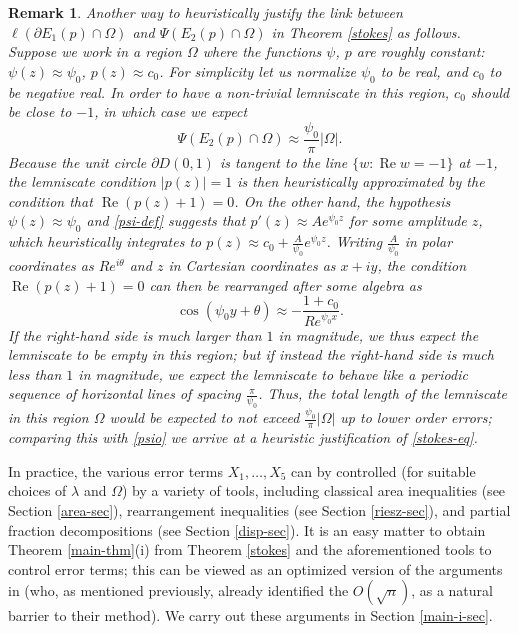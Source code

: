 \documentclass[12pt]{amsart}
\newtheorem{remark}{Remark}[section]
\renewcommand{\Re}{\operatorname{Re}}
\begin{document}
\begin{remark} Another way to heuristically justify the link between $\ell(\partial E_1(p) \cap \Omega)$ and $\Psi(E_2(p) \cap \Omega)$ in Theorem \ref{stokes} as follows.  Suppose we work in a region $\Omega$ where the functions $\psi$, $p$ are roughly constant: $\psi(z) \approx \psi_0$, $p(z) \approx c_0$.  For simplicity let us normalize $\psi_0$ to be real, and $c_0$ to be negative real.  In order to have a non-trivial lemniscate in this region, $c_0$ should be close to $-1$, in which case we expect
    \begin{equation}\label{psio}
        \Psi(E_2(p) \cap \Omega) \approx \frac{\psi_0}{\pi} |\Omega|.
    \end{equation}
  Because the unit circle $\partial D(0,1)$ is tangent to the line $\{ w: \Re w = -1\}$ at $-1$, the lemniscate condition $|p(z)|=1$ is then heuristically approximated by the condition that $\Re (p(z) + 1) = 0$.  On the other hand, the hypothesis $\psi(z) \approx \psi_0$ and \eqref{psi-def} suggests that $p'(z) \approx A e^{\psi_0 z}$ for some amplitude $z$, which heuristically integrates to $p(z) \approx c_0 + \frac{A}{\psi_0} e^{\psi_0 z}$.  Writing $\frac{A}{\psi_0}$ in polar coordinates as $Re^{i\theta}$ and $z$ in Cartesian coordinates as $x+iy$, the condition $\Re(p(z)+1)=0$ can then be rearranged after some algebra as
$$ \cos (\psi_0 y + \theta) \approx -\frac{1+c_0}{Re^{\psi_0 x}}.$$
If the right-hand side is much larger than $1$ in magnitude, we thus expect the lemniscate to be empty in this region; but if instead the right-hand side is much less than $1$ in magnitude, we expect the lemniscate to behave like a periodic sequence of horizontal lines of spacing $\frac{\pi}{\psi_0}$.  Thus, the total length of the lemniscate in this region $\Omega$ would be expected to not exceed $\frac{\psi_0}{\pi} |\Omega|$ up to lower order errors; comparing this with \eqref{psio} we arrive at a heuristic justification of \eqref{stokes-eq}.
\end{remark}

In practice, the various error terms $X_1,\dots,X_5$ can by controlled (for suitable choices of $\lambda$ and $\Omega$) by a variety of tools, including classical area inequalities (see Section \ref{area-sec}), rearrangement inequalities (see Section \ref{riesz-sec}), and partial fraction decompositions (see Section \ref{disp-sec}). It is an easy matter to obtain Theorem \ref{main-thm}(i) from Theorem \ref{stokes} and the aforementioned tools to control error terms; this can be viewed as an optimized version of the arguments in \cite{fryntov} (who, as mentioned previously, already identified the $O(\sqrt{n})$, as a natural barrier to their method). We carry out these arguments in Section \ref{main-i-sec}.
\end{document}
